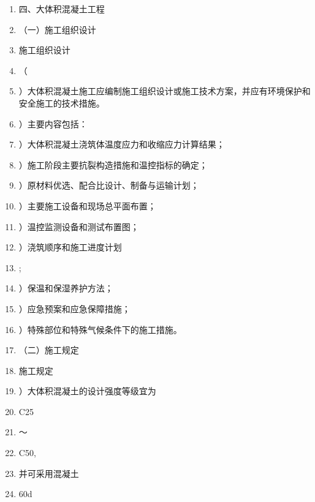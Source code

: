 \documentclass[UTF8,fontset=fandol,11pt]{ctexart}
\begin{document}
\begin{enumerate}[label=\arabic*.]

\item 四、大体积混凝土工程

\item （一）施工组织设计

\item 施工组织设计

\item （

\item ）大体积混凝土施工应编制施工组织设计或施工技术方案，并应有环境保护和安全施工的技术措施。

\item ）主要内容包括：

\item ）大体积混凝土浇筑体温度应力和收缩应力计算结果；

\item ）施工阶段主要抗裂构造措施和温控指标的确定；

\item ）原材料优选、配合比设计、制备与运输计划；

\item ）主要施工设备和现场总平面布置；

\item ）温控监测设备和测试布置图；

\item ）浇筑顺序和施工进度计划

\item ;

\item ）保温和保湿养护方法；

\item ）应急预案和应急保障措施；

\item ）特殊部位和特殊气候条件下的施工措施。

\item （二）施工规定

\item 施工规定

\item ）大体积混凝土的设计强度等级宜为

\item C25

\item ～

\item C50,

\item 并可采用混凝土

\item 60d

\end{enumerate}
\end{document}

